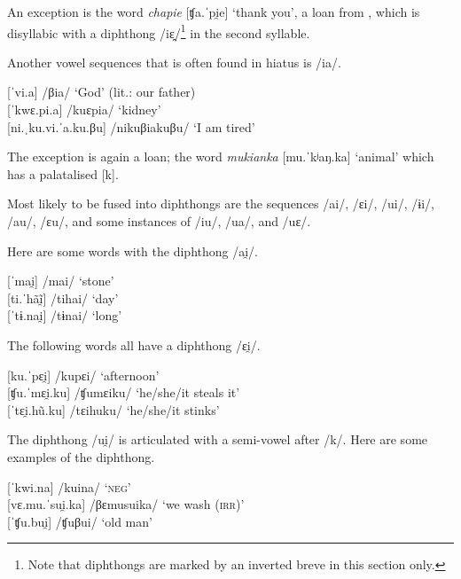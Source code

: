 An exception is the word \textit{chapie} [ʧa.ˈpi̯e] ‘thank you’, a loan from , which is disyllabic with a diphthong /iɛ̯/\footnote{Note that diphthongs are marked by an inverted breve in this section only.} in the second syllable.	
	
Another vowel sequences that is often found in hiatus is /ia/.  

\ea %
	{[}ˈvi.a] \tab\tab\tab /βia/ \tab\tab\tab ‘God’ (lit.: our father) \\
	{[}ˈkwɛ.pi.a] \tab\tab /kuɛpia/ \tab\tab ‘kidney’\\
	{[}ni.ˌku.vi.ˈa.ku.βu] \tab /nikuβiakuβu/ \tab ‘I am tired’\\%
\xe


The exception is again a  loan; the word \textit{mukianka} [mu.ˈkʲaŋ.ka] ‘animal’ which has a palatalised [k].

Most likely to be fused into diphthongs are the sequences /ai/, /ɛi/, /ui/, /ɨi/, /au/, /ɛu/, and some instances of /iu/, /ua/, and /uɛ/.

Here are some words with the diphthong /ai̯/.

\ea %
	{[}ˈmai̯] \tab /mai/ \tab\tab ‘stone’\\
	{[}ti.ˈhãĩ̯] \tab /tihai/ \tab ‘day’\\
	{[}ˈtɨ.nai̯] \tab /tɨnai/ \tab ‘long’\\%
	\xe
		
The following words all have a diphthong /ɛi̯/.
	
\ea %
	{[}ku.ˈpɛi̯] \tab /kupɛi/ \tab ‘afternoon’\\
	{[}ʧu.ˈmɛi̯.ku] \tab /ʧumɛiku/ \tab ‘he/she/it steals it’\\
	{[}ˈtɛi̯.hũ.ku] \tab /tɛihuku/ \tab ‘he/she/it stinks’\\%
	\xe

The diphthong /ui̯/ is articulated with a semi-vowel after /k/. Here are some examples of the diphthong.

\ea %
        {[}ˈkwi.na] \tab\tab /kuina/ \tab\tab ‘\textsc{neg}’\\
	{[}vɛ.mu.ˈsui̯.ka] \tab /βɛmusuika/ \tab ‘we wash (\textsc{irr})’\\
	{[}ˈʧu.bui̯] \tab\tab /ʧuβui/ \tab\tab ‘old man’\\%
	\xe	
	
